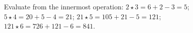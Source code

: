 Evaluate from the innermost operation: $2\star 3=6+2-3=5$; $5\star 4=20+5-4=21$; $21\star 5=105+21-5=121$; $121\star 6=726+121-6=\boxed{841}$.
